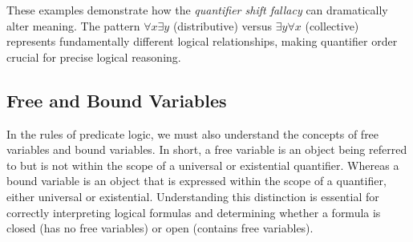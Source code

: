 \documentclass[12pt,a4paper,openany]{article}
\begin{document}
These examples demonstrate how the \emph{quantifier shift fallacy} can
dramatically alter meaning. The pattern \(\forall x \exists y\)
(distributive) versus \(\exists y \forall x\) (collective) represents
fundamentally different logical relationships, making quantifier order
crucial for precise logical reasoning.

\subsection{Free and Bound
Variables}\label{free-and-bound-variables}

In the rules of predicate logic, we must also understand the concepts of
free variables and bound variables. In short, a free variable is an
object being referred to but is not within the scope of a universal or
existential quantifier. Whereas a bound variable is an object that is
expressed within the scope of a quantifier, either universal or
existential. Understanding this distinction is essential for correctly
interpreting logical formulas and determining whether a formula is
closed (has no free variables) or open (contains free variables).
\end{document}
